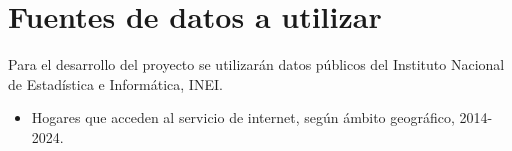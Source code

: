 \section{Fuentes de datos a utilizar}

Para el desarrollo del proyecto se utilizarán datos públicos del Instituto Nacional de Estadística e Informática, INEI.

\begin{itemize}
    \item Hogares que acceden al servicio de internet, según ámbito geográfico, 2014-2024.
\end{itemize}
